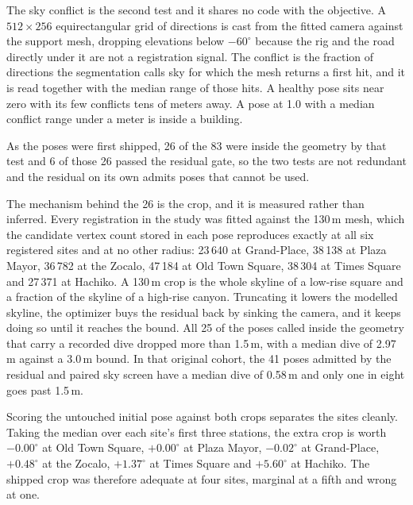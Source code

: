 \documentclass[journal]{IEEEtran}
\begin{document}
The sky conflict is the second test and it shares no code with the objective. A
$512 \times 256$ equirectangular grid of directions is cast from the fitted
camera against the support mesh, dropping elevations below $-60^\circ$ because
the rig and the road directly under it are not a registration signal. The
conflict is the fraction of directions the segmentation calls sky for which the
mesh returns a first hit, and it is read together with the median range of those
hits. A healthy pose sits near zero with its few conflicts tens of meters away.
A pose at 1.0 with a median conflict range under a meter is inside a building.

As the poses were first shipped, 26 of the 83 were inside the geometry by that
test and 6 of those 26 passed the residual gate, so the two tests are not
redundant and the residual on its own admits poses that cannot be used.

The mechanism behind the 26 is the crop, and it is measured rather than
inferred. Every registration in the study was fitted against the 130\,m mesh,
which the candidate vertex count stored in each pose reproduces exactly at all
six registered sites and at no other radius: 23\,640 at Grand-Place, 38\,138 at
Plaza Mayor, 36\,782 at the Zocalo, 47\,184 at Old Town Square, 38\,304 at Times
Square and 27\,371 at Hachiko. A 130\,m crop is the whole skyline of a low-rise
square and a fraction of the skyline of a high-rise canyon. Truncating it lowers
the modelled skyline, the optimizer buys the residual back by sinking the
camera, and it keeps doing so until it reaches the bound. All 25 of the poses
called inside the geometry that carry a recorded dive dropped more than 1.5\,m,
with a median dive of 2.97\,m against a 3.0\,m bound. In that original cohort,
the 41 poses admitted by the residual and paired sky screen have a median dive
of 0.58\,m and only one in eight goes past 1.5\,m.

Scoring the untouched initial pose against both crops separates the sites
cleanly. Taking the median over each site's first three stations, the extra crop
is worth $-0.00^\circ$ at Old Town Square, $+0.00^\circ$ at Plaza Mayor,
$-0.02^\circ$ at Grand-Place, $+0.48^\circ$ at the Zocalo, $+1.37^\circ$ at
Times Square and $+5.60^\circ$ at Hachiko. The shipped crop was therefore
adequate at four sites, marginal at a fifth and wrong at one.
\end{document}
